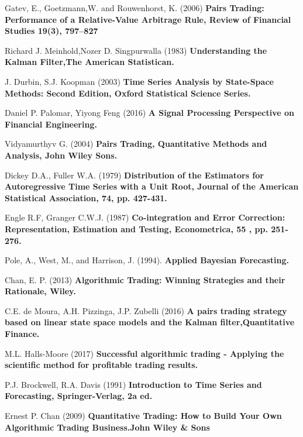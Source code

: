 \documentclass[]{article}
\begin{document}




\break 

\begin{thebibliography}{9}


Gatev, E., Goetzmann,W. and Rouwenhorst, K. (2006)
\textbf{Pairs Trading: Performance of a Relative-Value Arbitrage Rule, Review of Financial Studies 19(3), 797–827}

Richard J. Meinhold,Nozer D. Singpurwalla (1983)
\textbf{Understanding the Kalman Filter,The American Statistican.}


J. Durbin, S.J. Koopman (2003)
\textbf{Time Series Analysis by State-Space Methods: Second Edition, Oxford Statistical Science Series.}

Daniel P. Palomar, Yiyong Feng (2016)
\textbf{A Signal Processing Perspective on Financial Engineering.}

Vidyamurthyv G. (2004)
\textbf{Pairs Trading, Quantitative Methods and Analysis, John Wiley Sons.}

Dickey D.A., Fuller W.A. (1979)
\textbf{Distribution of the Estimators for Autoregressive Time Series with a Unit Root, Journal of the American Statistical Association, 74, pp. 427-431.}

Engle R.F, Granger C.W.J. (1987)
\textbf{Co-integration and Error Correction: Representation, Estimation and Testing, Econometrica, 55 , pp. 251-276.}

Pole, A., West, M., and Harrison, J. (1994). 
\textbf{Applied Bayesian Forecasting.}

 Chan, E. P. (2013) 
\textbf{Algorithmic Trading: Winning Strategies and their Rationale, Wiley.}


C.E. de Moura, A.H. Pizzinga, J.P. Zubelli (2016) 
\textbf{A pairs trading strategy based on linear state space models and the Kalman filter,Quantitative Finance.}


M.L. Halls-Moore (2017) 
\textbf{Successful algorithmic trading - Applying the scientific method for profitable trading results.}

P.J. Brockwell, R.A. Davis (1991)
\textbf{ Introduction to Time Series and Forecasting, Springer-Verlag, 2a ed.}

Ernest P. Chan (2009)
\textbf{ Quantitative Trading: How to Build Your Own Algorithmic Trading Business.John Wiley \& Sons}


\end{thebibliography}
\end{document}
